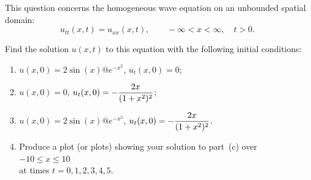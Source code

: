 This question concerns the homogeneous wave equation on an unbounded spatial domain:
          \[ u_{tt}(x,t) = u_{xx}(x,t),
               \qquad -\infty < x < \infty,  
               \quad   t>0.\]

Find the solution $u(x,t)$ to this equation with 
the following initial conditions:
\begin{enumerate}
\item $u(x,0) = 2 \sin(x)@ e^{-x^2}$, 
      \quad $u_t(x,0) = 0$;

\vspace*{1em}
\item $u(x,0) = 0$, \hspace*{4.5em}
      \quad $u_t(x,0) = -\displaystyle{2x\over (1+x^2)^2}$;

\vspace*{1em}
\item $u(x,0) = 2 \sin(x)@ e^{-x^2}$, 
      \quad $u_t(x,0) = -\displaystyle{2x\over (1+x^2)^2}$. 

\vspace*{1em}
\item Produce a plot (or plots) showing your solution to part~(c) over $-10\le x \le 10$\\
      at times $t=0, 1, 2, 3, 4, 5$. 
\end{enumerate}

